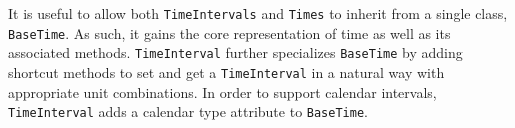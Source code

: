 

It is useful to allow both {\tt TimeIntervals} and {\tt Times} to 
inherit from a single class, {\tt BaseTime}.  As such,
it gains the core representation of time as well as its associated methods.
{\tt TimeInterval} further specializes {\tt BaseTime} by adding shortcut
methods to set and get a {\tt TimeInterval} in a natural way with
appropriate unit combinations.  In order to support calendar intervals,
{\tt TimeInterval} adds a calendar type attribute to {\tt BaseTime}.

